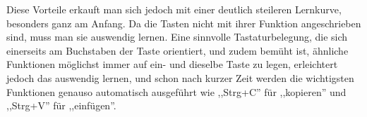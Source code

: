 Diese Vorteile erkauft man sich jedoch mit einer deutlich steileren Lernkurve, besonders ganz am Anfang. Da die Tasten nicht mit ihrer Funktion angeschrieben sind, muss man sie auswendig lernen. Eine sinnvolle Tastaturbelegung, die sich einerseits am Buchstaben der Taste orientiert, und zudem bemüht ist, ähnliche Funktionen möglichst immer auf ein- und dieselbe Taste zu legen, erleichtert jedoch das auswendig lernen, und schon nach kurzer Zeit werden die wichtigsten Funktionen genauso automatisch ausgeführt wie ,,Strg+C'' für ,,kopieren'' und ,,Strg+V'' für ,,einfügen''.

